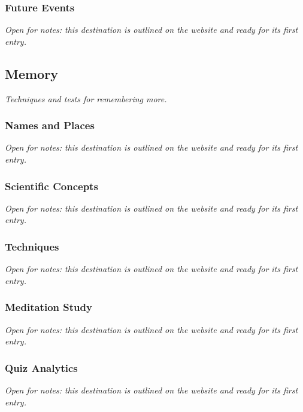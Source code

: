 \documentclass{article}
\begin{document}
\subsubsection{Future Events}\label{sec:future-events}
\textit{Open for notes: this destination is outlined on the website and ready for its first entry.}

\subsection{Memory}\label{sec:memory}
\textit{Techniques and tests for remembering more.}

\subsubsection{Names and Places}\label{sec:names-and-places}
\textit{Open for notes: this destination is outlined on the website and ready for its first entry.}

\subsubsection{Scientific Concepts}\label{sec:scientific-concepts}
\textit{Open for notes: this destination is outlined on the website and ready for its first entry.}

\subsubsection{Techniques}\label{sec:techniques}
\textit{Open for notes: this destination is outlined on the website and ready for its first entry.}

\subsubsection{Meditation Study}\label{sec:meditation-study}
\textit{Open for notes: this destination is outlined on the website and ready for its first entry.}

\subsubsection{Quiz Analytics}\label{sec:quiz-analytics}
\textit{Open for notes: this destination is outlined on the website and ready for its first entry.}
\end{document}
